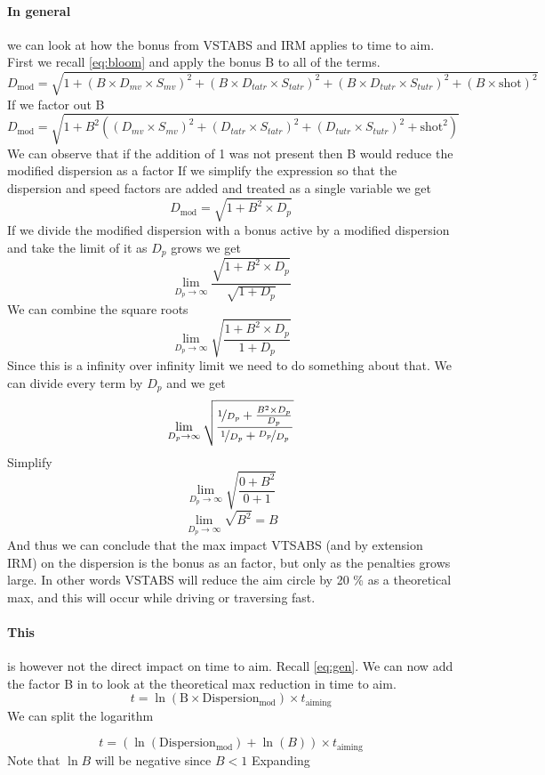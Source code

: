 \documentclass{article}
\begin{document}
\paragraph{In general}
we can look at how the bonus from VSTABS and IRM applies to time to aim.
First we recall \eqref{eq:bloom} and apply the bonus B to all of the terms.
\[D_{\mathrm{mod}} = \sqrt{1 + \left( B \times D_{mv}\times S_{mv}\right)^2 + \left(B \times D_{ta tr}\times S_{ta tr}\right)^2
+ \left(B \times D_{tu tr}\times S_{tu tr}\right)^2 +  \left( B \times \mathrm{shot}\right)^2}\]
If we factor out B
\[D_{\mathrm{mod}} = \sqrt{1 + B^2 \left( \left( D_{mv}\times S_{mv}\right)^2 + \left( D_{ta tr}\times S_{ta tr}\right)^2
+ \left( D_{tu tr} \times S_{tu tr} \right)^2 + \mathrm{shot}^2 \right) } \]
We can observe that if the addition of 1 was not present then B would reduce the modified dispersion as a factor
If we simplify the expression so that the dispersion and speed factors are added and treated as a single variable we get
\[D_{\mathrm{mod}} = \sqrt{1 + B ^2 \times D_p}\]
If we divide the modified dispersion with a bonus active by a modified dispersion and take the limit of it as \(D_p\) grows we get
\[ \lim\limits_{D_p \to \infty}  \frac{\sqrt{1 + B ^2 \times D_p}}{\sqrt{1 + D_p}} \] 
We can combine the square roots
\[ \lim\limits_{D_p \to \infty} \sqrt{\frac{1 + B ^2 \times D_p}{1 + D_p}} \]
Since this is a infinity over infinity limit we need to do something about that.
We can divide every term by \(D_p\) and we get
\[ \lim\limits_{D_p \to \infty} \sqrt{ \frac{\nicefrac{1}{D_p} + \frac{B^2\times D_p}{D_p}}{\nicefrac{1}{D_p} + \nicefrac{D_p}{D_p}} }\]
Simplify
\[ \lim\limits_{D_p \to \infty} \sqrt{ \frac{0 + B^2}{0 + 1}}\]
\[ \lim\limits_{D_p \to \infty} \sqrt{B^2} = B\]
And thus we can conclude that the max impact VTSABS (and by extension IRM) on the dispersion is the bonus
as an factor, but only as the penalties grows large. In other words VSTABS will reduce the aim circle by 20 \% 
as a theoretical max, and this will occur while driving or traversing fast. 
\paragraph{This}
is however not the direct impact on time to aim. Recall \eqref{eq:gen}. We can now add the factor B in to look at the theoretical max
reduction in time to aim.
\[ t = \ln \left(\mathrm{B \times Dispersion_{mod}}\right) \times t_{\mathrm{aiming}}\]
We can split the logarithm

\[ t = \left(\ln\left(\mathrm{Dispersion_{mod}}\right) + \ln \left( B\right)\right) \times t_{\mathrm{aiming}} \]
Note that \(\ln B\) will be negative since \( B < 1 \)
Expanding
\end{document}
